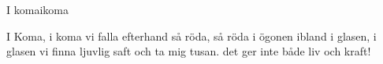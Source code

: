 \begin{song}{I koma}{ikoma}
\begin{vers}
I Koma, i koma
vi falla efterhand
så röda, så röda
i ögonen ibland
i glasen, i glasen
vi finna ljuvlig saft
och ta mig tusan. det ger inte
både liv och kraft!
\end{vers}
\end{song}

